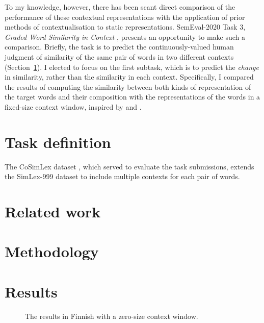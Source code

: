 To my knowledge, however, there has been scant direct comparison of the performance of
these contextual representations with the application of prior methods of
contextualisation to static representations.
SemEval-2020 Task 3, \emph{Graded Word Similarity in Context}
\parencite{Armendariz2020a}, presents an opportunity to make such a comparison.
Briefly, the task is to predict the continuously-valued human judgment of similarity of
the same pair of words in two different contexts (Section~\ref{task-definition}).
I elected to focus on the first subtask, which is to predict the \emph{change} in
similarity, rather than the similarity in each context.
Specifically, I compared the results of computing the similarity between both kinds of
representation of the target words and their composition with the representations of
the words in a fixed-size context window, inspired by \textcite{Kintsch2001} and
\textcite{Mitchell2008}.

\section{Task definition}
\label{task-definition}

The CoSimLex dataset \parencite{Armendariz2020}, which served to evaluate the task
submissions, extends the SimLex-999 dataset \parencite{Hill2015} to include multiple
contexts for each pair of words.

\section{Related work}

\section{Methodology}

\section{Results}

\begin{figure}
  \centering
  \caption{The results in Finnish with a zero-size context window.}
\end{figure}

